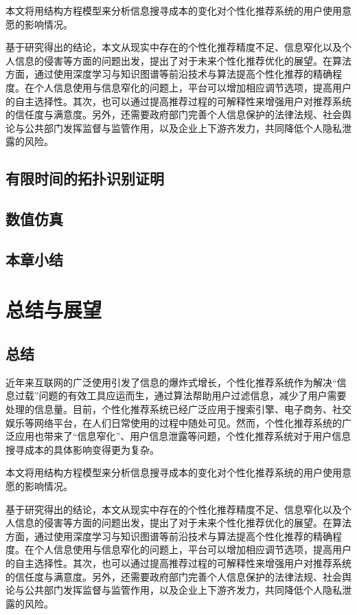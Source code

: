 \documentclass[a4paper,zihao=-4,UTF8]{ctexart}
\numberwithin{equation}{section}
\begin{document}
	本文将用结构方程模型来分析信息搜寻成本的变化对个性化推荐系统的用户使用意愿的影响情况。
	
	基于研究得出的结论，本文从现实中存在的个性化推荐精度不足、信息窄化以及个人信息的侵害等方面的问题出发，提出了对于未来个性化推荐优化的展望。在算法方面，通过使用深度学习与知识图谱等前沿技术与算法提高个性化推荐的精确程度。在个人信息使用与信息窄化的问题上，平台可以增加相应调节选项，提高用户的自主选择性。其次，也可以通过提高推荐过程的可解释性来增强用户对推荐系统的信任度与满意度。另外，还需要政府部门完善个人信息保护的法律法规、社会舆论与公共部门发挥监督与监管作用，以及企业上下游齐发力，共同降低个人隐私泄露的风险。
	\subsection{有限时间的拓扑识别证明}
	\subsection{数值仿真}
	\subsection{本章小结}
	
\section{总结与展望}
	\subsection{总结}
	近年来互联网的广泛使用引发了信息的爆炸式增长，个性化推荐系统作为解决“信息过载”问题的有效工具应运而生，通过算法帮助用户过滤信息，减少了用户需要处理的信息量。目前，个性化推荐系统已经广泛应用于搜索引擎、电子商务、社交娱乐等网络平台，在人们日常使用的过程中随处可见。然而，个性化推荐系统的广泛应用也带来了“信息窄化”、用户信息泄露等问题，个性化推荐系统对于用户信息搜寻成本的具体影响变得更为复杂。
	
	本文将用结构方程模型来分析信息搜寻成本的变化对个性化推荐系统的用户使用意愿的影响情况。
	
	基于研究得出的结论，本文从现实中存在的个性化推荐精度不足、信息窄化以及个人信息的侵害等方面的问题出发，提出了对于未来个性化推荐优化的展望。在算法方面，通过使用深度学习与知识图谱等前沿技术与算法提高个性化推荐的精确程度。在个人信息使用与信息窄化的问题上，平台可以增加相应调节选项，提高用户的自主选择性。其次，也可以通过提高推荐过程的可解释性来增强用户对推荐系统的信任度与满意度。另外，还需要政府部门完善个人信息保护的法律法规、社会舆论与公共部门发挥监督与监管作用，以及企业上下游齐发力，共同降低个人隐私泄露的风险。
\end{document}
